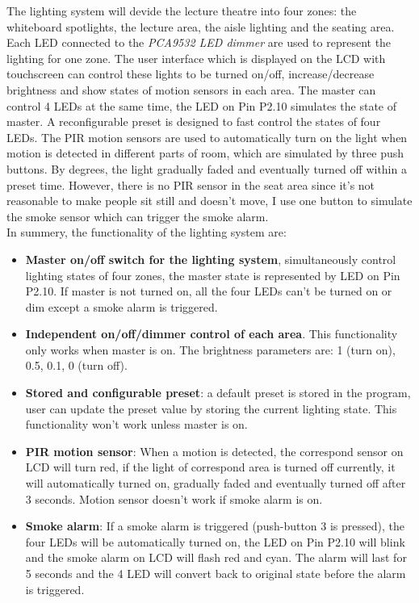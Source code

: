 The lighting system will devide the lecture theatre into four zones: the whiteboard spotlights, the lecture area, the aisle lighting and the seating area. Each LED connected to the \textit{PCA9532 LED dimmer }are used to represent the lighting for one zone. The user interface which is displayed on the LCD with touchscreen can control these lights to be turned on/off, increase/decrease brightness and show states of motion sensors in each area. The master can control 4 LEDs at the same time, the LED on Pin P2.10 simulates the state of master. A reconfigurable preset is designed to fast control the states of four LEDs. The PIR motion sensors are used to automatically turn on the light when motion is detected in different parts of room, which are simulated by three push buttons. By degrees, the light gradually faded and eventually turned off within a preset time. However, there is no PIR sensor in the seat area since it's not reasonable to make people sit still and doesn't move, I use one button to simulate the smoke sensor which can trigger the smoke alarm.   \\

In summery, the functionality of the lighting system are:
\begin{itemize}
\item \textbf{Master on/off switch for the lighting system}, simultaneously control lighting states of four zones, the master state is represented by LED on Pin P2.10. If master is not turned on, all the four LEDs can't be turned on or dim except a smoke alarm is triggered.
\item \textbf{Independent on/off/dimmer control of each area}. This functionality only works when master is on. The brightness parameters are: 1 (turn on), 0.5, 0.1, 0 (turn off).
\item \textbf{Stored and configurable preset}: a default preset is stored in the program, user can update the preset value by storing the current lighting state. This functionality won't work unless master is on.
\item \textbf{PIR motion sensor}: When a motion is detected, the correspond sensor on LCD will turn red, if the light of correspond area is turned off currently, it will automatically turned on, gradually faded and eventually turned off after 3 seconds. Motion sensor doesn't work if smoke alarm is on.
\item\textbf{Smoke alarm}: If a smoke alarm is triggered (push-button 3 is pressed), the four LEDs will be automatically turned on, the LED on Pin P2.10 will blink and the smoke alarm on LCD will flash red and cyan. The alarm will last for 5 seconds and the 4 LED will convert back to original state before the alarm is triggered.
\end{itemize}




